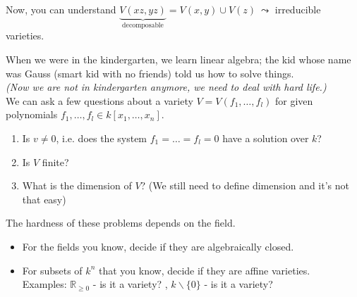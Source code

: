 \begin{remark}[title = Remark 1.2.3b]
  Now, you can understand $\underbrace{V(xz, yz)}_{\text{decomposable}} = V(x,y) \cup V(z) \ \leadsto$ irreducible varieties.  
\end{remark}

\begin{remark}[title = Remark 1.2.3c]
  When we were in the kindergarten, we learn linear algebra; the kid whose name was Gauss (smart kid with no friends) told us how to solve things.   \\

  \hspace*{0.5cm}\textcolor{airforceblue}{\textit{(Now we are not in kindergarten anymore, we need to deal with hard life.)}}  \\

  We can ask a few questions about a variety $V = V(f_1, \ldots, f_l)$ for given polynomials $f_1, \ldots, f_l \in k[x_1, \dots, x_n]$. 
  \begin{enumerate}
    \item Is $v \neq 0$, i.e. does the system $f_1 = \ldots = f_l = 0$ have a solution over $k$?  
    \item Is $V$ finite? 
    \item What is the dimension of $V$? (We still need to define dimension and it's not that easy)
  \end{enumerate}
  The hardness of these problems depends on the field. 
\end{remark}

\begin{exercise}[title = Exercise 1.2.4]
  \begin{itemize}
    \item[a)] For the fields you know, decide if they are algebraically closed.  
    \item[b)] For subsets of $k^n$ that you know, decide if they are affine varieties. \\
    Examples: $\mathbb{R}_{\geq 0}$ - is it a variety? , $k \backslash \{0\}$ - is it a variety? 
  \end{itemize}
\end{exercise}

